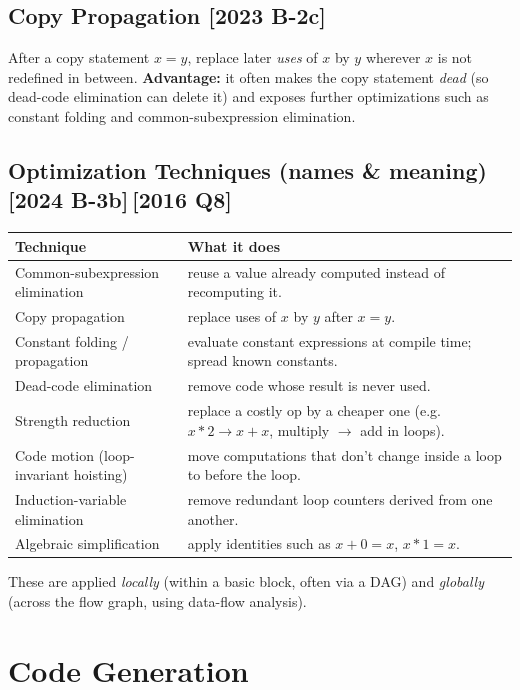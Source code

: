 \documentclass[12pt, a4paper]{article}
\newenvironment{qbox}{\begin{mdframed}[style=qframe]}{\end{mdframed}}
\newcommand{\yr}[1]{{\small\color{accent}\textbf{[#1]}}}
\begin{document}
\subsection{Copy Propagation \yr{2023 B-2c}}
\begin{qbox}
After a copy statement \(x = y\), replace later \emph{uses} of \(x\) by \(y\) wherever \(x\) is not redefined in between.
\textbf{Advantage:} it often makes the copy statement \emph{dead} (so dead-code elimination can delete it) and exposes
further optimizations such as constant folding and common-subexpression elimination.
\end{qbox}

\subsection{Optimization Techniques (names \& meaning) \yr{2024 B-3b}\,\yr{2016 Q8}}
\begin{qbox}
\begin{tabularx}{\linewidth}{@{}l Y@{}}
\toprule
\textbf{Technique} & \textbf{What it does}\\
\midrule
Common-subexpression elimination & reuse a value already computed instead of recomputing it.\\
Copy propagation & replace uses of $x$ by $y$ after $x=y$.\\
Constant folding / propagation & evaluate constant expressions at compile time; spread known constants.\\
Dead-code elimination & remove code whose result is never used.\\
Strength reduction & replace a costly op by a cheaper one (e.g.\ \(x*2\to x{+}x\), multiply $\to$ add in loops).\\
Code motion (loop-invariant hoisting) & move computations that don't change inside a loop to before the loop.\\
Induction-variable elimination & remove redundant loop counters derived from one another.\\
Algebraic simplification & apply identities such as $x+0=x$, $x*1=x$.\\
\bottomrule
\end{tabularx}
\smallskip
These are applied \emph{locally} (within a basic block, often via a DAG) and \emph{globally} (across the flow graph, using data-flow analysis).
\end{qbox}

\section{Code Generation}
\end{document}
